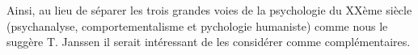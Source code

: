 Ainsi, au lieu de séparer les trois grandes voies de la psychologie du
XXème siècle (psychanalyse, comportementalisme et pychologie
humaniste) comme nous le suggère T. Janssen
\autocite[197]{van_eersel_cerveau} il serait intéressant de les
considérer comme complémentaires.




































































